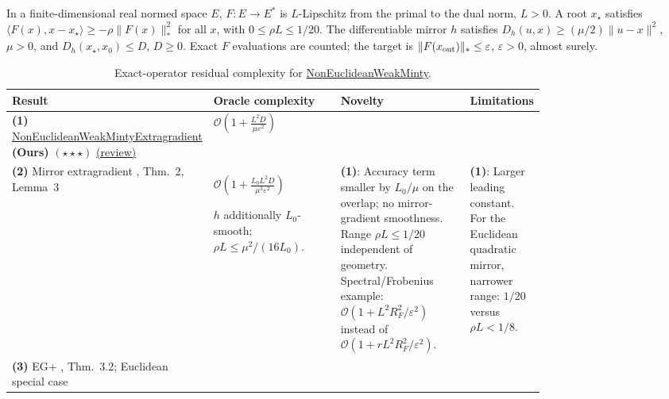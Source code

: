 \begin{table}[tp]
\centering
\caption{Exact-operator residual complexity for \href{https://github.com/k3nfalt/longtails/blob/main/LongTails/Setups/NonEuclideanWeakMinty.lean}{NonEuclideanWeakMinty}.}\label{tab:NonEuclideanWeakMinty}
\parbox{\linewidth}{\footnotesize In a finite-dimensional real normed space $E$, $F:E\to E^*$ is $L$-Lipschitz from the primal to the dual norm, $L>0$. A root $x_\star$ satisfies $\langle F(x),x-x_\star\rangle\ge-\rho\|F(x)\|_*^2$ for all $x$, with $0\le\rho L\le1/20$. The differentiable mirror $h$ satisfies $D_h(u,x)\ge(\mu/2)\|u-x\|^2$, $\mu>0$, and $D_h(x_\star,x_0)\le D$, $D\ge0$. Exact $F$ evaluations are counted; the target is $\|F(x_{\rm out})\|_*\le\varepsilon$, $\varepsilon>0$, almost surely.}\par\smallskip
\begin{threeparttable}
\footnotesize
\setlength{\tabcolsep}{4pt}\renewcommand{\arraystretch}{1.25}
\begin{tabularx}{\linewidth}{@{}>{\raggedright\arraybackslash}p{0.20\linewidth}>{\raggedright\arraybackslash}p{0.29\linewidth}>{\raggedright\arraybackslash}p{0.29\linewidth}>{\raggedright\arraybackslash}X@{}}
\toprule
\textbf{Result} & \textbf{Oracle complexity} & \textbf{Novelty} & \textbf{Limitations} \\
\midrule
\textbf{(1)} \href{https://github.com/k3nfalt/longtails/blob/main/LongTails/Theorems/NonEuclideanWeakMintyExtragradient.lean}{Non\allowbreak Euclidean\allowbreak Weak\allowbreak Minty\allowbreak Extragradient} \textbf{(Ours)} $(\star\star\star)$ \href{https://github.com/k3nfalt/longtails/blob/main/scripts/reviews/NonEuclideanWeakMintyExtragradient.md}{(review)}
& $\mathcal{O}\!\left(1+\frac{L^2D}{\mu\varepsilon^2}\right)$ & & \\
\midrule[1.2pt]
\textbf{(2)} Mirror extragradient \citep{newmZhangDai2022v2}, Thm.~2, Lemma~3
& $\mathcal{O}\!\left(1+\frac{L_0L^2D}{\mu^3\varepsilon^2}\right)$\par $h$ additionally $L_0$-smooth; $\rho L\le\mu^2/(16L_0)$.
& \textbf{(1)}: Accuracy term smaller by $L_0/\mu$ on the overlap; no mirror-gradient smoothness. Range $\rho L\le1/20$ independent of geometry. Spectral/Frobenius example: $\mathcal{O}(1+L^2R_F^2/\varepsilon^2)$ instead of $\mathcal{O}(1+rL^2R_F^2/\varepsilon^2)$.
& \textbf{(1)}: Larger leading constant. For the Euclidean quadratic mirror, narrower range: $1/20$ versus $\rho L<1/8$. \\
\midrule
\textbf{(3)} EG+ \citep{newmDDJ2021v2}, Thm.~3.2; Euclidean special case

\end{tabularx}
\end{threeparttable}
\end{table}
